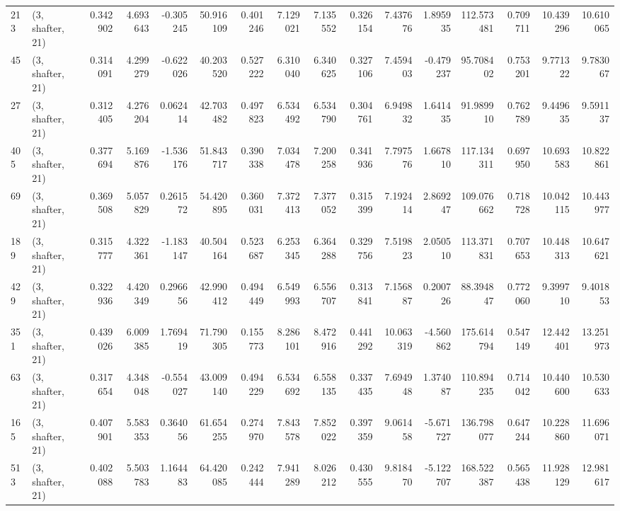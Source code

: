 \begin{tabular}{llrrrrrrrrrrrrrr}
213 &  (3, shafter, 21) &   0.342902 &   4.693643 &  -0.305245 &    50.916109 &   0.401246 &   7.129021 &   7.135552 &  0.326154 &   7.437676 &   1.895935 &   112.573481 &  0.709711 &  10.439296 &  10.610065 \\
45  &  (3, shafter, 21) &   0.314091 &   4.299279 &  -0.622026 &    40.203520 &   0.527222 &   6.310040 &   6.340625 &  0.327106 &   7.459403 &  -0.479237 &    95.708402 &  0.753201 &   9.771322 &   9.783067 \\
27  &  (3, shafter, 21) &   0.312405 &   4.276204 &   0.062414 &    42.703482 &   0.497823 &   6.534492 &   6.534790 &  0.304761 &   6.949832 &   1.641435 &    91.989910 &  0.762789 &   9.449635 &   9.591137 \\
405 &  (3, shafter, 21) &   0.377694 &   5.169876 &  -1.536176 &    51.843717 &   0.390338 &   7.034478 &   7.200258 &  0.341936 &   7.797576 &   1.667810 &   117.134311 &  0.697950 &  10.693583 &  10.822861 \\
69  &  (3, shafter, 21) &   0.369508 &   5.057829 &   0.261572 &    54.420895 &   0.360031 &   7.372413 &   7.377052 &  0.315399 &   7.192414 &   2.869247 &   109.076662 &  0.718728 &  10.042115 &  10.443977 \\
189 &  (3, shafter, 21) &   0.315777 &   4.322361 &  -1.183147 &    40.504164 &   0.523687 &   6.253345 &   6.364288 &  0.329756 &   7.519823 &   2.050510 &   113.371831 &  0.707653 &  10.448313 &  10.647621 \\
429 &  (3, shafter, 21) &   0.322936 &   4.420349 &   0.296656 &    42.990412 &   0.494449 &   6.549993 &   6.556707 &  0.313841 &   7.156887 &   0.200726 &    88.394847 &  0.772060 &   9.399710 &   9.401853 \\
351 &  (3, shafter, 21) &   0.439026 &   6.009385 &   1.769419 &    71.790305 &   0.155773 &   8.286101 &   8.472916 &  0.441292 &  10.063319 &  -4.560862 &   175.614794 &  0.547149 &  12.442401 &  13.251973 \\
63  &  (3, shafter, 21) &   0.317654 &   4.348048 &  -0.554027 &    43.009140 &   0.494229 &   6.534692 &   6.558135 &  0.337435 &   7.694948 &   1.374087 &   110.894235 &  0.714042 &  10.440600 &  10.530633 \\
165 &  (3, shafter, 21) &   0.407901 &   5.583353 &   0.364056 &    61.654255 &   0.274970 &   7.843578 &   7.852022 &  0.397359 &   9.061458 &  -5.671727 &   136.798077 &  0.647244 &  10.228860 &  11.696071 \\
513 &  (3, shafter, 21) &   0.402088 &   5.503783 &   1.164483 &    64.420085 &   0.242444 &   7.941289 &   8.026212 &  0.430555 &   9.818470 &  -5.122707 &   168.522387 &  0.565438 &  11.928129 &  12.981617 \\

\end{tabular}
